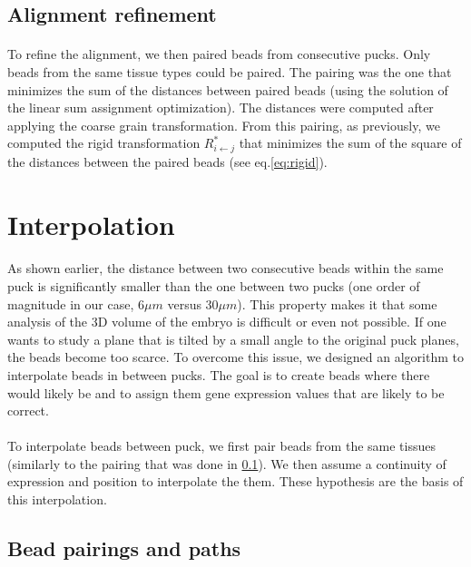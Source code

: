 \documentclass[10pt,a4paper]{article}
\begin{document}
\subsection{Alignment refinement}\label{subsec:ali-ref}
\paragraph{}To refine the alignment, we then paired beads from consecutive pucks.
Only beads from the same tissue types could be paired.
The pairing was the one that minimizes the sum of the distances between paired beads (using the solution of the linear sum assignment optimization).
The distances were computed after applying the coarse grain transformation.
From this pairing, as previously, we computed the rigid transformation \(R^*_{i\leftarrow j}\) that minimizes the sum of the square of the distances between the paired beads (see eq.\eqref{eq:rigid}).
\section{Interpolation}
\paragraph{}As shown earlier, the distance between two consecutive beads within the same puck is significantly smaller than the one between two pucks (one order of magnitude in our case, 6\(\mu m\) versus 30\(\mu m\)). This property makes it that some analysis of the 3D volume of the embryo is difficult or even not possible. If one wants to study a plane that is tilted by a small angle to the original puck planes, the beads become too scarce. To overcome this issue, we designed an algorithm to interpolate beads in between pucks. The goal is to create beads where there would likely be and to assign them gene expression values that are likely to be correct.
\paragraph{}To interpolate beads between puck, we first pair beads from the same tissues (similarly to the pairing that was done in \ref{subsec:ali-ref}). We then assume a continuity of expression and position to interpolate the them. These hypothesis are the basis of this interpolation.
\subsection{Bead pairings and paths}
\end{document}
